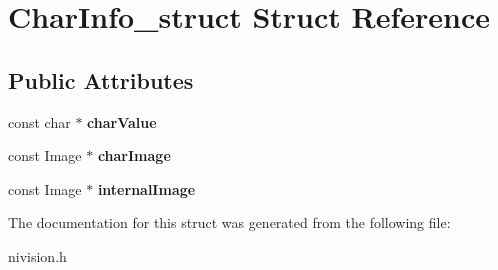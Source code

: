 \hypertarget{structCharInfo__struct}{\section{\-Char\-Info\-\_\-struct \-Struct \-Reference}
\label{structCharInfo__struct}
}
\subsection*{\-Public \-Attributes}
\begin{DoxyCompactItemize}
\item 
\hypertarget{structCharInfo__struct_a2ce78e6a0fa0c1843353273850ea6211}{const char $\ast$ {\bfseries char\-Value}}\label{structCharInfo__struct_a2ce78e6a0fa0c1843353273850ea6211}

\item 
\hypertarget{structCharInfo__struct_ad087d6c2213e2a42050f87e5284a37da}{const \-Image $\ast$ {\bfseries char\-Image}}\label{structCharInfo__struct_ad087d6c2213e2a42050f87e5284a37da}

\item 
\hypertarget{structCharInfo__struct_a81032de443b4aca64eeb867113e3f953}{const \-Image $\ast$ {\bfseries internal\-Image}}\label{structCharInfo__struct_a81032de443b4aca64eeb867113e3f953}

\end{DoxyCompactItemize}


\-The documentation for this struct was generated from the following file\-:\begin{DoxyCompactItemize}
\item 
nivision.\-h\end{DoxyCompactItemize}
